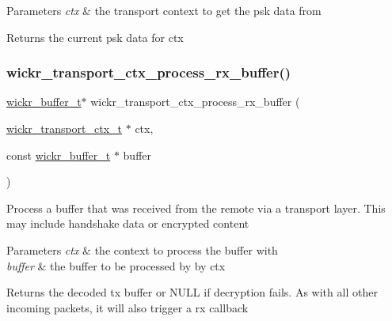\begin{DoxyParams}{Parameters}
{\em ctx} & the transport context to get the psk data from \\
\hline
\end{DoxyParams}
\begin{DoxyReturn}{Returns}
the current psk data for \textquotesingle{}ctx\textquotesingle{} 
\end{DoxyReturn}
\mbox{\label{group__wickr__transport__ctx_gaa0af661e209143c19633e1244ac59db4}} 
\subsubsection{\texorpdfstring{wickr\+\_\+transport\+\_\+ctx\+\_\+process\+\_\+rx\+\_\+buffer()}{wickr\_transport\_ctx\_process\_rx\_buffer()}}
{\footnotesize\ttfamily \mbox{\hyperlink{structwickr__buffer}{wickr\+\_\+buffer\+\_\+t}}$\ast$ wickr\+\_\+transport\+\_\+ctx\+\_\+process\+\_\+rx\+\_\+buffer (\begin{DoxyParamCaption}\item[{\mbox{\hyperlink{structwickr__transport__ctx}{wickr\+\_\+transport\+\_\+ctx\+\_\+t}} $\ast$}]{ctx,  }\item[{const \mbox{\hyperlink{structwickr__buffer}{wickr\+\_\+buffer\+\_\+t}} $\ast$}]{buffer }\end{DoxyParamCaption})}

Process a buffer that was received from the remote via a transport layer. This may include handshake data or encrypted content


\begin{DoxyParams}{Parameters}
{\em ctx} & the context to process the buffer with \\
\hline
{\em buffer} & the buffer to be processed by by \textquotesingle{}ctx\textquotesingle{} \\
\hline
\end{DoxyParams}
\begin{DoxyReturn}{Returns}
the decoded tx buffer or N\+U\+LL if decryption fails. As with all other incoming packets, it will also trigger a rx callback 
\end{DoxyReturn}
\mbox{\label{group__wickr__transport__ctx_ga60dad2360ba29d8c131093a4e9b69057}} 
